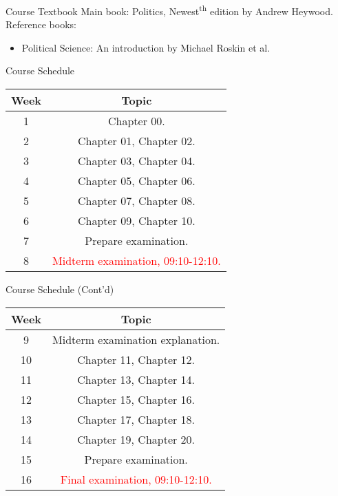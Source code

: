 \documentclass{beamer}
\begin{document}
\begin{frame}{Course Textbook}
\pause
Main book: Politics, Newest\textsuperscript{th} edition by Andrew Heywood. \\
\pause
Reference books:
\begin{itemize}
\pause
\item Political Science: An introduction by Michael Roskin et al.
\end{itemize}
\end{frame}
\begin{frame}{Course Schedule}
\begin{center}
\begin{tabular}{|c|c|}
\hline
Week & Topic \\
\hline
1 & Chapter 00.\\
\hline
2 & Chapter 01, Chapter 02.\\
\hline
3 & Chapter 03, Chapter 04.\\
\hline
4 & Chapter 05, Chapter 06.\\
\hline
5 & Chapter 07, Chapter 08.\\
\hline
6 & Chapter 09, Chapter 10.\\
\hline
7 & Prepare examination.\\
\hline
8 & \textcolor{red}{Midterm examination, 09:10-12:10.}\\
\hline
\end{tabular}
\end{center}
\end{frame}
\begin{frame}{Course Schedule (Cont'd)}
\begin{center}
\begin{tabular}{|c|c|}
\hline
Week & Topic \\
\hline
9 & Midterm examination explanation.\\
\hline
10 & Chapter 11, Chapter 12.\\
\hline
11 & Chapter 13, Chapter 14.\\
\hline
12 & Chapter 15, Chapter 16.\\
\hline
13 & Chapter 17, Chapter 18.\\
\hline
14 & Chapter 19, Chapter 20.\\
\hline
15 & Prepare examination.\\
\hline
16 & \textcolor{red}{Final examination, 09:10-12:10.}\\
\hline
\end{tabular}
\end{center}
\end{frame}
\end{document}
